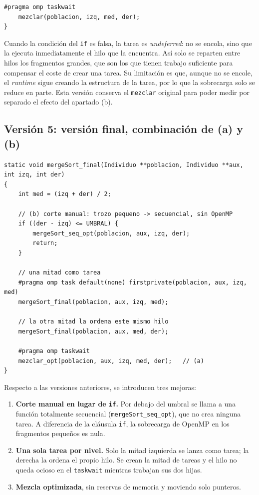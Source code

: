 \documentclass[12pt]{article}
\begin{document}
\begin{enumerate}
\begin{lstlisting}[style=EstiloC]
    #pragma omp taskwait
    mezclar(poblacion, izq, med, der);
}
\end{lstlisting}
 
Cuando la condición del \texttt{if} es falsa, la tarea es \textit{undeferred}: no se encola, sino que la ejecuta inmediatamente el hilo que la encuentra. Así solo se reparten entre hilos los fragmentos grandes, que son los que tienen trabajo suficiente para compensar el coste de crear una tarea. Su limitación es que, aunque no se encole, el \textit{runtime} sigue creando la estructura de la tarea, por lo que la sobrecarga solo se reduce en parte. Esta versión conserva el \texttt{mezclar} original para poder medir por separado el efecto del apartado (b).
 
\subsection*{Versión 5: versión final, combinación de (a) y (b)}
 
\begin{lstlisting}[style=EstiloC]
static void mergeSort_final(Individuo **poblacion, Individuo **aux, int izq, int der)
{
    int med = (izq + der) / 2;
 
    // (b) corte manual: trozo pequeno -> secuencial, sin OpenMP
    if ((der - izq) <= UMBRAL) {
        mergeSort_seq_opt(poblacion, aux, izq, der);
        return;
    }
 
    // una mitad como tarea
    #pragma omp task default(none) firstprivate(poblacion, aux, izq, med)
    mergeSort_final(poblacion, aux, izq, med);
 
    // la otra mitad la ordena este mismo hilo
    mergeSort_final(poblacion, aux, med, der);
 
    #pragma omp taskwait
    mezclar_opt(poblacion, aux, izq, med, der);   // (a)
}
\end{lstlisting}
 
Respecto a las versiones anteriores, se introducen tres mejoras:
 
\begin{enumerate}
    \item \textbf{Corte manual en lugar de \texttt{if}.} Por debajo del umbral se llama a una función totalmente secuencial (\texttt{mergeSort\_seq\_opt}), que no crea ninguna tarea. A diferencia de la cláusula \texttt{if}, la sobrecarga de OpenMP en los fragmentos pequeños es nula.
    \item \textbf{Una sola tarea por nivel.} Solo la mitad izquierda se lanza como tarea; la derecha la ordena el propio hilo. Se crean la mitad de tareas y el hilo no queda ocioso en el \texttt{taskwait} mientras trabajan sus dos hijas.
    \item \textbf{Mezcla optimizada}, sin reservas de memoria y moviendo solo punteros.
\end{enumerate}
 

\end{enumerate}
\end{document}
